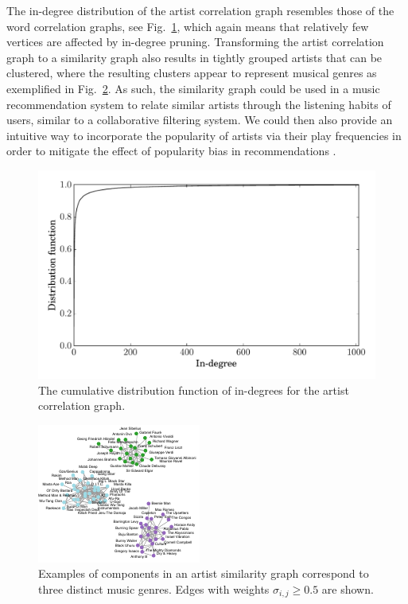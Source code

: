 \documentclass{kais}
\newcommand{\sy}[1]{\sigma_{#1}}
\begin{document}
The in-degree distribution of the artist correlation graph resembles those of the word correlation graphs, see Fig.\ \ref{fig:last-fm-id-cdf},
which again means that relatively few vertices are affected by in-degree pruning. Transforming the artist correlation
graph to a similarity graph also results in tightly grouped artists that can be clustered, where the resulting
clusters appear to represent musical genres as exemplified in Fig.\ \ref{fig:artists}. As such, the similarity graph could
 be used in a music recommendation system to relate similar artists 
through the listening habits of users, similar to a collaborative filtering system. We could then also provide an
 intuitive way to incorporate the popularity of artists via their play frequencies in order to mitigate the 
 effect of popularity bias in recommendations \cite{celma2008hits}.

\begin{figure}
\centerline{\includegraphics[width=0.75\columnwidth]{figures/last-fm-id-cdf.pdf}}
\caption{The cumulative distribution function of in-degrees for the artist correlation graph.}
\label{fig:last-fm-id-cdf}
\end{figure}

\begin{figure}
\centerline{\includegraphics[width=0.75\columnwidth]{figures/last-fm-example-3.pdf}}
\caption{Examples of components in an artist similarity graph correspond to three distinct music genres. Edges with weights $\sy{i,j} \geq 0.5$ are shown.}
\label{fig:artists}
\end{figure}
\end{document}
